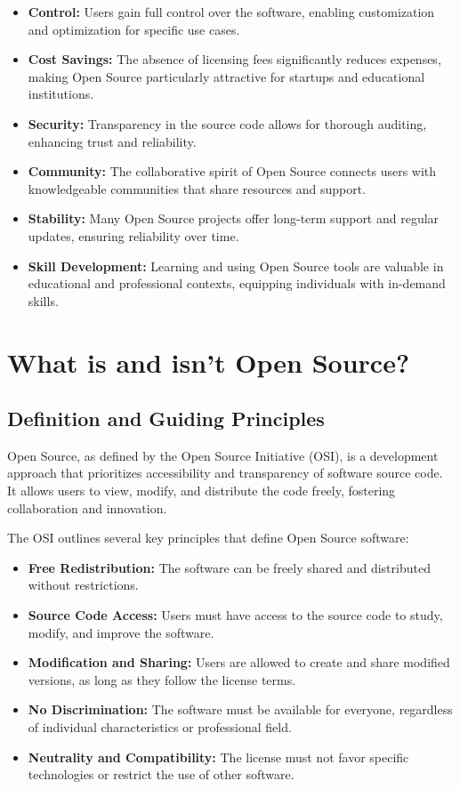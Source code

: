 \begin{itemize}
    \item \textbf{Control:} Users gain full control over the software, enabling customization and optimization for specific use cases.
    \item \textbf{Cost Savings:} The absence of licensing fees significantly reduces expenses, making Open Source particularly attractive for startups and educational institutions.
    \item \textbf{Security:} Transparency in the source code allows for thorough auditing, enhancing trust and reliability.
    \item \textbf{Community:} The collaborative spirit of Open Source connects users with knowledgeable communities that share resources and support.
    \item \textbf{Stability:} Many Open Source projects offer long-term support and regular updates, ensuring reliability over time.
    \item \textbf{Skill Development:} Learning and using Open Source tools are valuable in educational and professional contexts, equipping individuals with in-demand skills.
\end{itemize}


\section{What is and isn’t Open Source?}

\subsection{Definition and Guiding Principles}

Open Source, as defined by the Open Source Initiative (OSI), is a development approach that prioritizes accessibility and transparency of software source code. It allows users to view, modify, and distribute the code freely, fostering collaboration and innovation. 

The OSI outlines several key principles that define Open Source software:

\begin{itemize}
    \item \textbf{Free Redistribution:} The software can be freely shared and distributed without restrictions.
    \item \textbf{Source Code Access:} Users must have access to the source code to study, modify, and improve the software.
    \item \textbf{Modification and Sharing:} Users are allowed to create and share modified versions, as long as they follow the license terms.
    \item \textbf{No Discrimination:} The software must be available for everyone, regardless of individual characteristics or professional field.
    \item \textbf{Neutrality and Compatibility:} The license must not favor specific technologies or restrict the use of other software.
\end{itemize}

